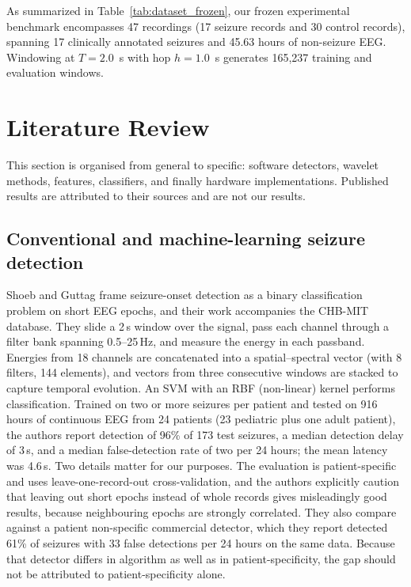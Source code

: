 \documentclass[10pt,twocolumn,letterpaper]{article}
\begin{document}
{As summarized in Table~\ref{tab:dataset_frozen}, our frozen experimental benchmark encompasses 47 recordings (17 seizure records and 30 control records), spanning 17 clinically annotated seizures and 45.63 hours of non-seizure EEG. Windowing at $T=2.0$~s with hop $h=1.0$~s generates 165,237 training and evaluation windows.
}

\section{Literature Review}
\label{sec:lit}

This section is organised from general to specific: software detectors,
wavelet methods, features, classifiers, and finally hardware
implementations. Published results are attributed to their sources and
are not our results.

\subsection{Conventional and machine-learning seizure detection}

Shoeb and Guttag \cite{shoeb2010icml} frame seizure-onset detection as a
binary classification problem on short EEG epochs, and their work
accompanies the CHB-MIT database. They slide a 2\,s window over the
signal, pass each channel through a filter bank spanning 0.5--25\,Hz, and
measure the energy in each passband. Energies from 18 channels are
concatenated into a spatial--spectral vector (with 8 filters, 144
elements), and vectors from three consecutive windows are stacked to
capture temporal evolution. An SVM with an RBF (non-linear) kernel
performs classification. Trained on two or more seizures per patient and
tested on 916 hours of continuous EEG from 24 patients (23 pediatric
plus one adult patient), the authors report detection of 96\% of 173
test seizures, a median detection delay of 3\,s, and a median
false-detection rate of two per 24 hours; the mean latency was 4.6\,s.
Two details matter for our purposes. The evaluation is patient-specific
and uses leave-one-record-out cross-validation, and the authors
explicitly caution that leaving out short epochs instead of whole
records gives misleadingly good results, because neighbouring epochs are
strongly correlated. They also compare against a patient non-specific
commercial detector, which they report detected 61\% of seizures with 33
false detections per 24 hours on the same data. Because that detector
differs in algorithm as well as in patient-specificity, the gap should
not be attributed to patient-specificity alone.
\end{document}
